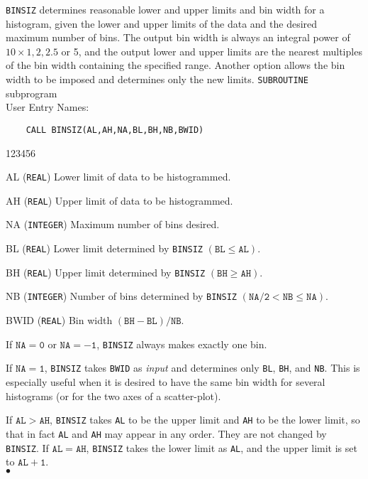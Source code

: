                          
                          
\Submitter{}                               
{\tt BINSIZ} determines reasonable lower and upper limits and
bin width for a histogram, given the lower and upper limits of the
data and the desired maximum number of bins. The output bin width
is always an integral power of $10 \times 1, 2, 2.5$ or 5, and the
output lower and upper limits are the nearest multiples of the bin
width containing the specified range. Another option allows the bin
width to be imposed and determines only the new limits.
\Structure
{\tt SUBROUTINE} subprogram \\
User Entry Names: 
\Usage
\begin{verbatim}
    CALL BINSIZ(AL,AH,NA,BL,BH,NB,BWID)
\end{verbatim}
\begin{DLtt}{123456}
\item [AL] ({\tt REAL}) Lower limit of data to be histogrammed.
\item [AH] ({\tt REAL}) Upper limit of data to be histogrammed.
\item [NA] ({\tt INTEGER}) Maximum number of bins desired.
\item [BL] ({\tt REAL}) Lower limit determined by {\tt BINSIZ}
$\mathtt{(BL \leq  AL)}$.
\item [BH] ({\tt REAL}) Upper limit determined by {\tt BINSIZ}
$\mathtt{(BH \geq  AH)}$.
\item [NB] ({\tt INTEGER}) Number of bins determined by {\tt BINSIZ}
$\mathtt{(NA/2 < NB \leq  NA)}$.
\item [BWID] ({\tt REAL}) Bin width $\mathtt{(BH-BL)/NB}$.
\end{DLtt}
If $\mathtt{NA=0}$ or $\mathtt{NA=-1}$, {\tt BINSIZ} always makes
exactly one bin.
\par
If $\mathtt{NA = 1}$, {\tt BINSIZ} takes {\tt BWID} as {\it input}
and determines only {\tt BL}, {\tt BH}, and {\tt NB}. This is
especially useful when it is desired to have the same bin width for
several histograms (or for the two axes of a scatter-plot).
\par
If $\mathtt{AL>AH}$, {\tt BINSIZ} takes {\tt AL} to be the upper limit
and {\tt AH} to be the lower limit, so that in fact {\tt AL} and
{\tt AH} may appear in any order. They are not changed by {\tt BINSIZ}.
If $\mathtt{AL = AH}$, {\tt BINSIZ} takes the lower limit as {\tt AL},
and the upper limit is set to $\mathtt{AL+1}$.
\\ $\bullet$
